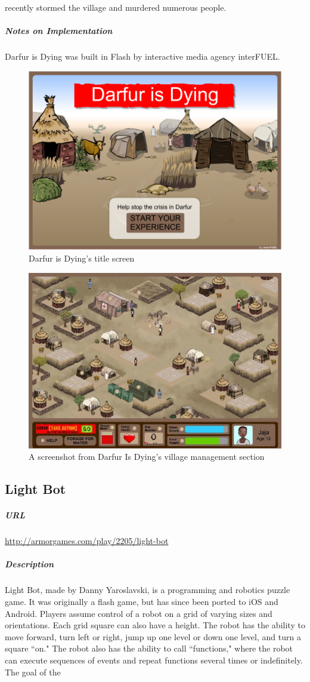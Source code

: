 recently stormed the village and murdered numerous people.\subparagraph{Notes on Implementation}Darfur is Dying was built in Flash by interactive media agency interFUEL.\begin{figure}[p]\centering \includegraphics[height=.4\textheight, width=\textwidth, keepaspectratio=true]{img/darfur_title.png}\caption{Darfur is Dying's title screen}\end{figure}\begin{figure}[p]\centering \includegraphics[height=.4\textheight, width=\textwidth, keepaspectratio=true]{img/darfur_screen1.jpg}\caption{A screenshot from Darfur Is Dying's village management section}\end{figure}\subsection{Light Bot}\subparagraph{URL}\url{http://armorgames.com/play/2205/light-bot}\subparagraph{Description}Light Bot, made by Danny Yaroslavski, is a programming and robotics puzzle game. It was originally a flash game, but has since been ported to iOS and Android. Players assume control of a robot on a grid of varying sizes and orientations. Each grid square can also have a height. The robot has the ability to move forward, turn left or right, jump up one level or down one level, and turn a square ``on." The robot also has the ability to call ``functions," where the robot can execute sequences of events and repeat functions several times or indefinitely. The goal of the 